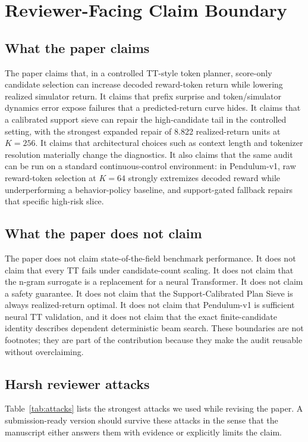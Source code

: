 \documentclass{article}
\newcommand{\method}{Support-Calibrated Plan Sieve}
\begin{document}
\section{Reviewer-Facing Claim Boundary}

\subsection{What the paper claims}

The paper claims that, in a controlled TT-style token planner, score-only candidate selection can increase decoded reward-token return while lowering realized simulator return. It claims that prefix surprise and token/simulator dynamics error expose failures that a predicted-return curve hides. It claims that a calibrated support sieve can repair the high-candidate tail in the controlled setting, with the strongest expanded repair of 8.822 realized-return units at \(K=256\). It claims that architectural choices such as context length and tokenizer resolution materially change the diagnostics. It also claims that the same audit can be run on a standard continuous-control environment: in Pendulum-v1, raw reward-token selection at \(K=64\) strongly extremizes decoded reward while underperforming a behavior-policy baseline, and support-gated fallback repairs that specific high-risk slice.

\subsection{What the paper does not claim}

The paper does not claim state-of-the-field benchmark performance. It does not claim that every TT fails under candidate-count scaling. It does not claim that the n-gram surrogate is a replacement for a neural Transformer. It does not claim a safety guarantee. It does not claim that the \method{} is always realized-return optimal. It does not claim that Pendulum-v1 is sufficient neural TT validation, and it does not claim that the exact finite-candidate identity describes dependent deterministic beam search. These boundaries are not footnotes; they are part of the contribution because they make the audit reusable without overclaiming.

\subsection{Harsh reviewer attacks}

Table~\ref{tab:attacks} lists the strongest attacks we used while revising the paper. A submission-ready version should survive these attacks in the sense that the manuscript either answers them with evidence or explicitly limits the claim.
\end{document}
